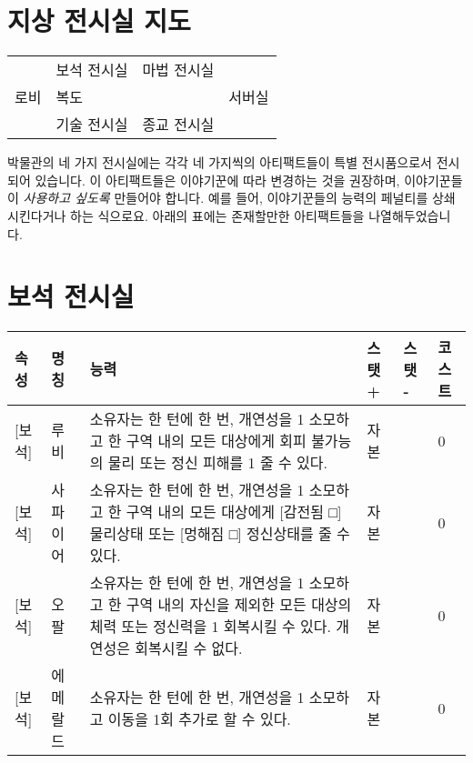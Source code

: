 \documentclass{report}
\begin{document}
	
	\section*{지상 전시실 지도}
	\begin{tabular}{|p{3cm}|p{3cm}|p{3cm}|p{3cm}|p{3cm}|p{3cm}|}
		\hline
		\multirow{5}{*}{로비} & \multicolumn{2}{p{3cm}|}{\multirow{2}{*}{보석 전시실}} & \multicolumn{2}{p{3cm}|}{\multirow{2}{*}{마법 전시실}} & \multirow{5}{*}{서버실} \\
		& \multicolumn{2}{p{3cm}|}{}                        & \multicolumn{2}{p{3cm}|}{}                        &                      \\ \cline{2-5}
		& \multicolumn{4}{p{6cm}|}{복도}                                                                     &                      \\ \cline{2-5}
		& \multicolumn{2}{p{3cm}|}{\multirow{2}{*}{기술 전시실}} & \multicolumn{2}{p{3cm}|}{\multirow{2}{*}{종교 전시실}} &                      \\
		& \multicolumn{2}{p{3cm}|}{}                        & \multicolumn{2}{c|}{}                        &                      \\ \hline
	\end{tabular}
	
	\bigskip
	
	박물관의 네 가지 전시실에는 각각 네 가지씩의 아티팩트들이 특별 전시품으로서 전시되어 있습니다. 이 아티팩트들은 이야기꾼에 따라 변경하는 것을 권장하며, 이야기꾼들이 \emph{사용하고 싶도록} 만들어야 합니다. 예를 들어, 이야기꾼들의 능력의 페널티를 상쇄시킨다거나 하는 식으로요. 아래의 표에는 존재할만한 아티팩트들을 나열해두었습니다.
	
	\section*{보석 전시실}
	\begin{tabularx}{\textwidth}{l|l|X|l|l|l}
		\textbf{속성} & \textbf{명칭} & \textbf{능력} & \textbf{스탯 +} & \textbf{스탯 -} & \textbf{코스트}\\ \hline \hline
		[저주][보석]& 루비   & 소유자는 한 턴에 한 번, 개연성을 1 소모하고 한 구역 내의 모든 대상에게 회피 불가능의 물리 또는 정신 피해를 1 줄 수 있다.   & 자본     & & 0    \\ \hline
		[저주][보석]& 사파이어   & 소유자는 한 턴에 한 번, 개연성을 1 소모하고 한 구역 내의 모든 대상에게 [감전됨 □] 물리상태 또는 [멍해짐 □] 정신상태를 줄 수 있다.   & 자본     & & 0    \\ \hline
		[저주][보석]& 오팔   &  소유자는 한 턴에 한 번, 개연성을 1 소모하고 한 구역 내의 자신을 제외한 모든 대상의 체력 또는 정신력을 1 회복시킬 수 있다. 개연성은 회복시킬 수 없다.  & 자본     & & 0    \\ \hline
		[저주][보석]& 에메랄드   & 소유자는 한 턴에 한 번, 개연성을 1 소모하고 이동을 1회 추가로 할 수 있다.   & 자본     & & 0    \\ 
	\end{tabularx}
	
\end{document}
